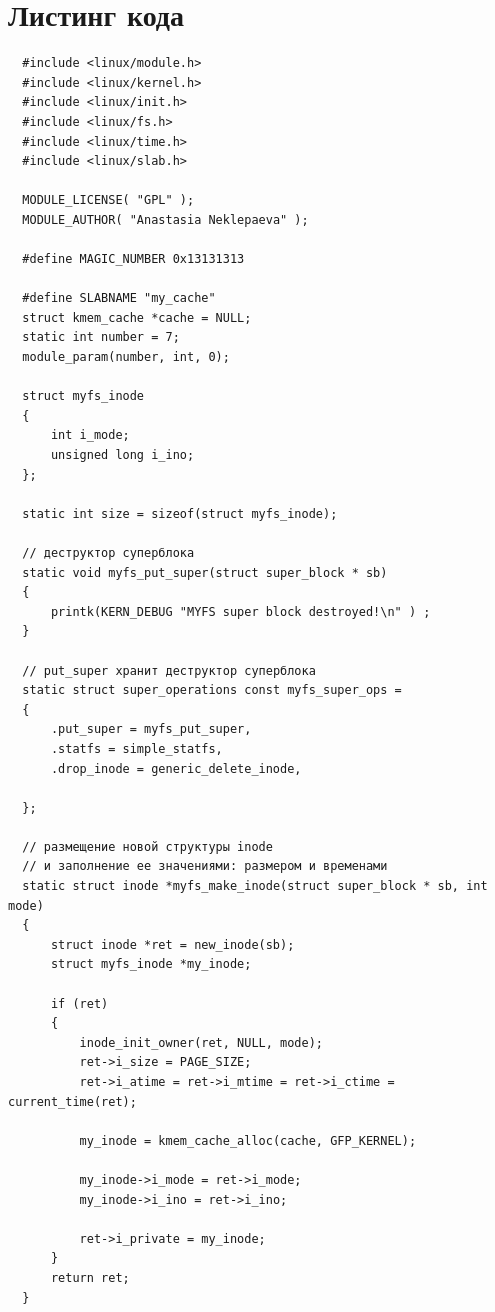 \documentclass[a4paper,14pt]{extreport} %
\begin{document}
\begin{figure}[th]
\noindent\centering{
}
\end{figure}

\newpage

\section*{Листинг кода}

\begin{lstlisting}
  #include <linux/module.h>
  #include <linux/kernel.h>
  #include <linux/init.h>
  #include <linux/fs.h>
  #include <linux/time.h>
  #include <linux/slab.h>

  MODULE_LICENSE( "GPL" );
  MODULE_AUTHOR( "Anastasia Neklepaeva" );

  #define MAGIC_NUMBER 0x13131313

  #define SLABNAME "my_cache"
  struct kmem_cache *cache = NULL; 
  static int number = 7;
  module_param(number, int, 0); 

  struct myfs_inode
  {
      int i_mode;
      unsigned long i_ino;
  };

  static int size = sizeof(struct myfs_inode);

  // деструктор суперблока
  static void myfs_put_super(struct super_block * sb)
  {
      printk(KERN_DEBUG "MYFS super block destroyed!\n" ) ;
  }

  // put_super хранит деструктор суперблока
  static struct super_operations const myfs_super_ops = 
  {
      .put_super = myfs_put_super,
      .statfs = simple_statfs,
      .drop_inode = generic_delete_inode,

  };

  // размещение новой структуры inode 
  // и заполнение ее значениями: размером и временами
  static struct inode *myfs_make_inode(struct super_block * sb, int mode)
  {
      struct inode *ret = new_inode(sb);
      struct myfs_inode *my_inode;

      if (ret)
      {
          inode_init_owner(ret, NULL, mode);
          ret->i_size = PAGE_SIZE;
          ret->i_atime = ret->i_mtime = ret->i_ctime = current_time(ret);

          my_inode = kmem_cache_alloc(cache, GFP_KERNEL);

          my_inode->i_mode = ret->i_mode;
          my_inode->i_ino = ret->i_ino;

          ret->i_private = my_inode;
      }
      return ret;
  }


\end{lstlisting}
\end{document}
